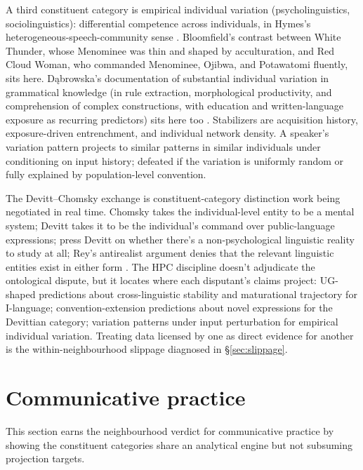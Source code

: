 \documentclass[12pt]{article}
\begin{document}
A third constituent category is empirical individual variation (psycholinguistics, sociolinguistics): differential competence across individuals, in Hymes's heterogeneous-speech-community sense \citep{hymes1972}. Bloomfield's contrast between White Thunder, whose Menominee was thin and shaped by acculturation, and Red Cloud Woman, who commanded Menominee, Ojibwa, and Potawatomi fluently, sits here. D\k{a}browska's documentation of substantial individual variation in grammatical knowledge (in rule extraction, morphological productivity, and comprehension of complex constructions, with education and written-language exposure as recurring predictors) sits here too \citep{dabrowska2012}. Stabilizers are acquisition history, exposure-driven entrenchment, and individual network density. A speaker's variation pattern projects to similar patterns in similar individuals under conditioning on input history; defeated if the variation is uniformly random or fully explained by population-level convention.

The Devitt--Chomsky exchange is constituent-category distinction work being negotiated in real time. Chomsky takes the individual-level entity to be a mental system; Devitt takes it to be the individual's command over public-language expressions; \textcite{collins2007, collins2008} press Devitt on whether there's a non-psychological linguistic reality to study at all; Rey's antirealist argument denies that the relevant linguistic entities exist in either form \citep{rey2006a, rey2006b}. The HPC discipline doesn't adjudicate the ontological dispute, but it locates where each disputant's claims project: UG-shaped predictions about cross-linguistic stability and maturational trajectory for I-language; convention-extension predictions about novel expressions for the Devittian category; variation patterns under input perturbation for empirical individual variation. Treating data licensed by one as direct evidence for another is the within-neighbourhood slippage diagnosed in §\ref{sec:slippage}.

\section{Communicative practice}\label{sec:communicative}

This section earns the neighbourhood verdict for communicative practice by showing the constituent categories share an analytical engine but not subsuming projection targets.
\end{document}
